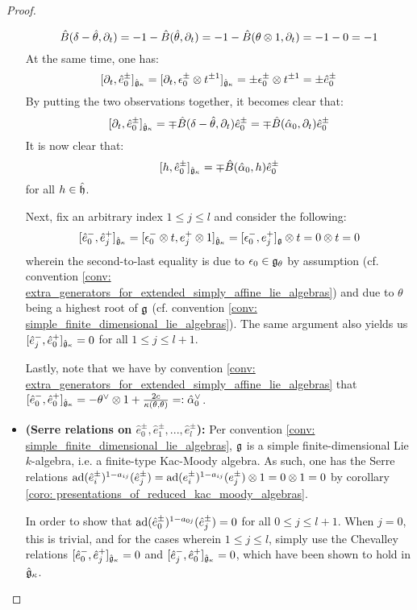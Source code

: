 \begin{proof}
\begin{itemize}
                                $$\hat{B}(\delta - \hat{\theta}, \del_t) = -1 - \hat{B}(\hat{\theta}, \del_t) = -1 - \hat{B}(\theta \tensor 1, \del_t) = -1 - 0 = -1$$
                            At the same time, one has:
                                $$[\del_t, \hat{e}_0^{\pm}]_{\hat{\g}_{\kappa}} = [\del_t, \e_0^{\pm} \tensor t^{\pm 1}]_{\hat{\g}_{\kappa}} = \pm \e_0^{\pm} \tensor t^{\pm 1} = \pm \hat{e}_0^{\pm}$$
                            By putting the two observations together, it becomes clear that:
                                $$[\partial_t, \hat{e}_0^{\pm}]_{\hat{\mathfrak{g}}_{\kappa}} = \mp \hat{B}(\delta - \hat{\theta}, \partial_t) \hat{e}_0^{\pm} = \mp \hat{B}(\hat{\alpha}_0, \partial_t) \hat{e}_0^{\pm}$$
                            It is now clear that:
                                $$[h, \hat{e}_0^{\pm}]_{\hat{\mathfrak{g}}_{\kappa}} = \mp \hat{B}(\hat{\alpha}_0, h) \hat{e}_0^{\pm}$$
                            for all $h \in \hat{\mathfrak{h}}$.
                                
                            Next, fix an arbitrary index $1 \leq j \leq l$ and consider the following:
                                $$[\hat{e}_0^-, \hat{e}_j^+]_{\hat{\g}_{\kappa}} = [\e_0^- \tensor t, e_j^+ \tensor 1]_{\hat{\g}_{\kappa}} = [\e_0^-, e_j^+]_{\g} \tensor t = 0 \tensor t = 0$$
                            wherein the second-to-last equality is due to $\epsilon_0 \in \mathfrak{g}_{\theta}$ by assumption (cf. convention \ref{conv: extra_generators_for_extended_simply_affine_lie_algebras}) and due to $\theta$ being a highest root of $\mathfrak{g}$ (cf. convention \ref{conv: simple_finite_dimensional_lie_algebras}). The same argument also yields us $[\hat{e}_j^-, \hat{e}_0^+]_{\hat{\mathfrak{g}}_{\kappa}} = 0$ for all $1 \leq j \leq l + 1$.
                            
                            Lastly, note that we have by convention \ref{conv: extra_generators_for_extended_simply_affine_lie_algebras} that $[\hat{e}_0^-, \hat{e}_0^+]_{\hat{\g}_{\kappa}} = - \theta^{\vee} \tensor 1 + \frac{2c}{\kappa(\theta, \theta)} =: \hat{\alpha}_0^{\vee}$.
                            \item \textbf{(Serre relations on $\hat{e}_0^{\pm}, \hat{e}_1^{\pm}, ..., \hat{e}_l^{\pm}$):} Per convention \ref{conv: simple_finite_dimensional_lie_algebras}, $\mathfrak{g}$ is a simple finite-dimensional Lie $k$-algebra, i.e. a finite-type Kac-Moody algebra. As such, one has the Serre relations $\ad(\hat{e}_i^{\pm})^{1 - a_{ij}}(\hat{e}_j^{\pm}) = \ad(e_i^{\pm})^{1 - a_{ij}}(e_j^{\pm}) \tensor 1 = 0 \tensor 1 = 0$ by corollary \ref{coro: presentations_of_reduced_kac_moody_algebras}.
                            
                            In order to show that $\mathrm{ad}(\hat{e}_0^{\pm})^{1 - a_{0j}}(\hat{e}_j^{\pm}) = 0$ for all $0 \leq j \leq l + 1$. When $j = 0$, this is trivial, and for the cases wherein $1 \leq j \leq l$, simply use the Chevalley relations $[\hat{e}_0^-, \hat{e}_j^+]_{\hat{\mathfrak{g}}_{\kappa}} = 0$ and $[\hat{e}_j^-, \hat{e}_0^+]_{\hat{\mathfrak{g}}_{\kappa}} = 0$, which have been shown to hold in $\hat{\mathfrak{g}}_{\kappa}$.
                        \end{itemize}
                \end{proof}
                
